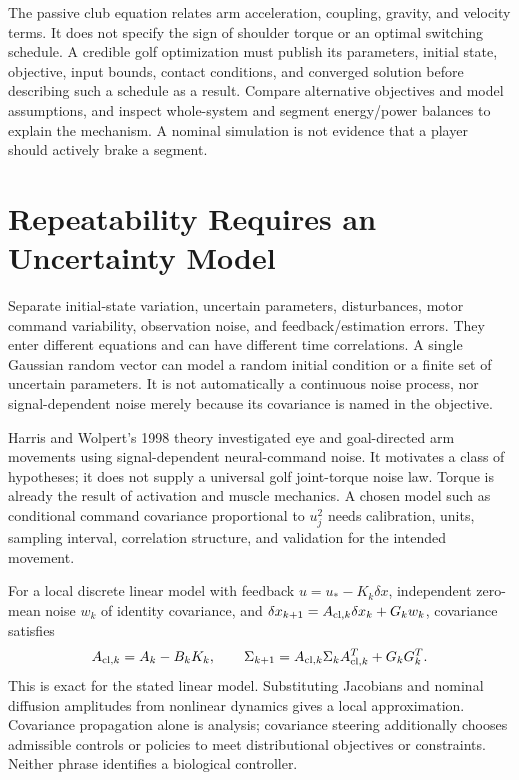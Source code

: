 \documentclass[12pt, openany]{book}
\theoremstyle{plain}
\begin{document}
The passive club equation relates arm acceleration, coupling, gravity, and
velocity terms. It does not specify the sign of shoulder torque or an
optimal switching schedule. A credible golf optimization must publish its
parameters, initial state, objective, input bounds, contact conditions, and
converged solution before describing such a schedule as a result. Compare
alternative objectives and model assumptions, and inspect whole-system
and segment energy/power balances to explain the mechanism. A nominal
simulation is not evidence that a player should actively brake a segment.

\section{Repeatability Requires an Uncertainty Model}

Separate initial-state variation, uncertain parameters, disturbances, motor
command variability, observation noise, and feedback/estimation errors.
They enter different equations and can have different time correlations.
A single Gaussian random vector can model a random initial condition or a
finite set of uncertain parameters. It is not automatically a continuous
noise process, nor signal-dependent noise merely because its covariance is
named in the objective.

Harris and Wolpert's 1998 theory investigated eye and goal-directed arm
movements using signal-dependent neural-command noise. It motivates a class
of hypotheses; it does not supply a universal golf joint-torque noise law.
Torque is already the result of activation and muscle mechanics. A chosen
model such as conditional command covariance proportional to $u_j^2$ needs
calibration, units, sampling interval, correlation structure, and validation
for the intended movement.

For a local discrete linear model with feedback
$u=u_*-K_k\delta x$, independent zero-mean noise $w_k$ of identity covariance,
and $\delta x_{k+1}=A_{{\rm cl},k}\delta x_k+G_kw_k$, covariance satisfies
\begin{equation}\label{eq:ocp_covariance}
 A_{{\rm cl},k}=A_k-B_kK_k,\qquad
 \Sigma_{k+1}=A_{{\rm cl},k}\Sigma_kA_{{\rm cl},k}^T+G_kG_k^T.
\end{equation}
This is exact for the stated linear model. Substituting Jacobians and nominal
diffusion amplitudes from nonlinear dynamics gives a local approximation.
Covariance propagation alone is analysis; covariance steering additionally
chooses admissible controls or policies to meet distributional objectives
or constraints. Neither phrase identifies a biological controller.
\end{document}
